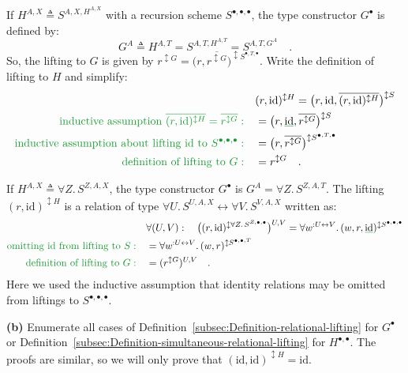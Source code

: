 If $H^{A,X}\triangleq S^{A,X,H^{A,X}}$ with a recursion scheme $S^{\bullet,\bullet,\bullet}$,
the type constructor $G^{\bullet}$ is defined by: 
\[
G^{A}\triangleq H^{A,T}=S^{A,T,H^{A,T}}=S^{A,T,G^{A}}\quad.
\]
So, the lifting to $G$ is given by $r^{\updownarrow G}=\big(r,\overline{r^{\updownarrow G}}\big)^{\updownarrow S^{\bullet,T,\bullet}}$.
Write the definition of lifting to $H$ and simplify:
\begin{align*}
 & (r,\text{id})^{\updownarrow H}=\big(r,\text{id},\overline{(r,\text{id})^{\updownarrow H}}\big)^{\updownarrow S}\\
{\color{greenunder}\text{inductive assumption }\overline{(r,\text{id})^{\updownarrow H}}=\overline{r^{\updownarrow G}}:}\quad & =\big(r,\gunderline{\text{id}},\overline{r^{\updownarrow G}}\big)^{\updownarrow S}\\
{\color{greenunder}\text{inductive assumption about lifting id to }S^{\bullet,\bullet,\bullet}:}\quad & =\big(r,\overline{r^{\updownarrow G}}\big)^{\updownarrow S^{\bullet,T,\bullet}}\\
{\color{greenunder}\text{definition of lifting to }G:}\quad & =r^{\updownarrow G}\quad.
\end{align*}

If $H^{A,X}\triangleq\forall Z.\,S^{Z,A,X}$, the type constructor
$G^{\bullet}$ is $G^{A}=\forall Z.\,S^{Z,A,T}$. The lifting $(r,\text{id})^{\updownarrow H}$
is a relation of type $\forall U.\,S^{U,A,X}\leftrightarrow\forall V.\,S^{V,A,X}$
written as:
\begin{align*}
 & \forall(U,V):\quad\big((r,\text{id})^{\updownarrow\forall Z.\,S^{Z,\bullet,\bullet}}\big)^{U,V}=\forall w^{:U\leftrightarrow V}.\,(w,r,\gunderline{\text{id}})^{\updownarrow S^{\bullet,\bullet,\bullet}}\\
{\color{greenunder}\text{omitting id from lifting to }S:}\quad & =\forall w^{:U\leftrightarrow V}.\,(w,r)^{\updownarrow S^{\bullet,\bullet,T}}\\
{\color{greenunder}\text{definition of lifting to }G:}\quad & =(r^{\updownarrow G})^{U,V}\quad.
\end{align*}
Here we used the inductive assumption that identity relations may
be omitted from liftings to $S^{\bullet,\bullet,\bullet}$.

\textbf{(b)} Enumerate all cases of Definition~\ref{subsec:Definition-relational-lifting}
for $G^{\bullet}$ or Definition~\ref{subsec:Definition-simultaneous-relational-lifting}
for $H^{\bullet,\bullet}$. The proofs are similar, so we will only
prove that $(\text{id},\text{id})^{\updownarrow H}=\text{id}$.

